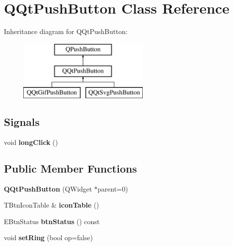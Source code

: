 \hypertarget{class_q_qt_push_button}{}\section{Q\+Qt\+Push\+Button Class Reference}
\label{class_q_qt_push_button}
Inheritance diagram for Q\+Qt\+Push\+Button\+:\begin{figure}[H]
\begin{center}
\leavevmode
\includegraphics[height=3.000000cm]{class_q_qt_push_button}
\end{center}
\end{figure}
\subsection*{Signals}
\begin{DoxyCompactItemize}
\item 
\mbox{\label{class_q_qt_push_button_aaae9f26f82f81a91b987bb1ff1fc7843}} 
void {\bfseries long\+Click} ()
\end{DoxyCompactItemize}
\subsection*{Public Member Functions}
\begin{DoxyCompactItemize}
\item 
\mbox{\label{class_q_qt_push_button_a1f1fe796703a42c21e0463213b55bdc3}} 
{\bfseries Q\+Qt\+Push\+Button} (Q\+Widget $\ast$parent=0)
\item 
\mbox{\label{class_q_qt_push_button_a86f1a09b1e68108265ab961b1d8d7df1}} 
T\+Btn\+Icon\+Table \& {\bfseries icon\+Table} ()
\item 
\mbox{\label{class_q_qt_push_button_a1789486b4ec009a7cfb3519c825a651b}} 
E\+Btn\+Status {\bfseries btn\+Status} () const
\item 
\mbox{\label{class_q_qt_push_button_a9a059da53440298bb2bf635d6dabca10}} 
void {\bfseries set\+Ring} (bool op=false)
\end{DoxyCompactItemize}
